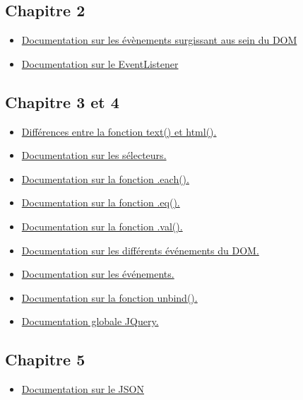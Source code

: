 \documentclass{article}[12pt]
\begin{document}
\subsection{Chapitre 2}
\begin{itemize}
    \item \href{http://www.w3schools.com/jsref/dom_obj_event.asp}{Documentation sur les évènements surgissant aus sein du DOM}
    \item \href{http://www.w3schools.com/js/js_htmldom_eventlistener.asp}{Documentation sur le EventListener}
\end{itemize}
\subsection{Chapitre 3 et 4}
\begin{itemize}
	\item \href{http://stackoverflow.com/questions/1910794/what-is-the-difference-between-jquery-text-and-html}{Différences entre la fonction text() et html().}
    \item \href{http://api.jquery.com/category/selectors/}{Documentation sur les sélecteurs.}
    \item \href{http://api.jquery.com/each/}{Documentation sur la fonction .each().}
    \item \href{http://api.jquery.com/eq/}{Documentation sur la fonction .eq().}
    \item \href{http://api.jquery.com/val/}{Documentation sur la fonction .val().}
    \item \href{http://www.w3schools.com/jsref/dom_obj_event.asp}{Documentation sur les différents événements du DOM.}
    \item \href{http://api.jquery.com/category/events/}{Documentation sur les événements.}
    \item \href{http://api.jquery.com/unbind/}{Documentation sur la fonction unbind().}
    \item \href{https://api.jquery.com}{Documentation globale JQuery.}
\end{itemize}
\subsection{Chapitre 5}
\begin{itemize}
	\item \href{http://json.org}{Documentation sur le JSON} 
\end{itemize}
\end{document}
